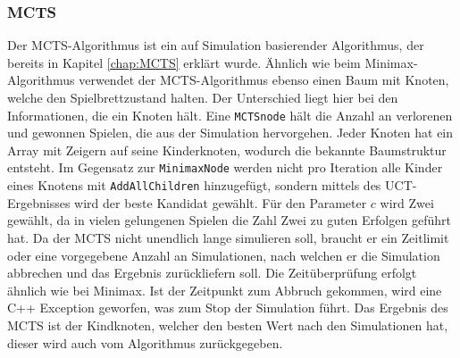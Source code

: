 \documentclass[12pt,a4paper,bibliography=totocnumbered,listof=totocnumbered]{article}
\begin{document}
\subsubsection{\ac{MCTS}}
Der \ac{MCTS}-Algorithmus ist ein auf Simulation basierender Algorithmus, der bereits in Kapitel \ref{chap:MCTS} erklärt wurde.
Ähnlich wie beim Minimax-Algorithmus verwendet der \ac{MCTS}-Algorithmus ebenso einen Baum mit Knoten, welche den Spielbrettzustand halten.
Der Unterschied liegt hier bei den Informationen, die ein Knoten hält. Eine \texttt{MCTSnode} hält die Anzahl an verlorenen und gewonnen Spielen,
die aus der Simulation hervorgehen. Jeder Knoten hat ein Array mit Zeigern auf seine Kinderknoten, wodurch die bekannte Baumstruktur entsteht.
Im Gegensatz zur \texttt{MinimaxNode} werden nicht pro Iteration alle Kinder eines Knotens mit \texttt{AddAllChildren} hinzugefügt, sondern mittels des 
\ac{UCT}-Ergebnisses wird der beste Kandidat gewählt. Für den Parameter $c$ wird Zwei gewählt, da in vielen gelungenen Spielen die Zahl Zwei 
zu guten Erfolgen geführt hat. Da der \ac{MCTS} nicht unendlich lange simulieren soll, braucht er ein Zeitlimit oder eine vorgegebene Anzahl an Simulationen,
nach welchen er die Simulation abbrechen und das Ergebnis zurückliefern soll. Die Zeitüberprüfung erfolgt ähnlich wie bei Minimax.
Ist der Zeitpunkt zum Abbruch gekommen, wird eine C++ Exception geworfen, was zum Stop der Simulation führt. 
Das Ergebnis des \ac{MCTS} ist der Kindknoten, welcher den besten Wert nach den Simulationen hat, dieser wird auch vom Algorithmus zurückgegeben.
\end{document}
